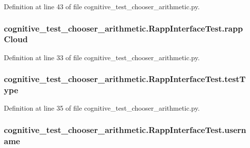 Definition at line 43 of file cognitive\-\_\-test\-\_\-chooser\-\_\-arithmetic.\-py.

\hypertarget{classcognitive__test__chooser__arithmetic_1_1RappInterfaceTest_a121b0d6b0186cfc8bfb4e65924e55533}{
\subsubsection[{rapp\-Cloud}]{\setlength{\rightskip}{0pt plus 5cm}cognitive\-\_\-test\-\_\-chooser\-\_\-arithmetic.\-Rapp\-Interface\-Test.\-rapp\-Cloud}}\label{classcognitive__test__chooser__arithmetic_1_1RappInterfaceTest_a121b0d6b0186cfc8bfb4e65924e55533}


Definition at line 33 of file cognitive\-\_\-test\-\_\-chooser\-\_\-arithmetic.\-py.

\hypertarget{classcognitive__test__chooser__arithmetic_1_1RappInterfaceTest_a4114c479e308297229e8282bf1801e3a}{
\subsubsection[{test\-Type}]{\setlength{\rightskip}{0pt plus 5cm}cognitive\-\_\-test\-\_\-chooser\-\_\-arithmetic.\-Rapp\-Interface\-Test.\-test\-Type}}\label{classcognitive__test__chooser__arithmetic_1_1RappInterfaceTest_a4114c479e308297229e8282bf1801e3a}


Definition at line 35 of file cognitive\-\_\-test\-\_\-chooser\-\_\-arithmetic.\-py.

\hypertarget{classcognitive__test__chooser__arithmetic_1_1RappInterfaceTest_a45c38133747a8a2ba8aa2969b1534cc6}{
\subsubsection[{username}]{\setlength{\rightskip}{0pt plus 5cm}cognitive\-\_\-test\-\_\-chooser\-\_\-arithmetic.\-Rapp\-Interface\-Test.\-username}}\label{classcognitive__test__chooser__arithmetic_1_1RappInterfaceTest_a45c38133747a8a2ba8aa2969b1534cc6}


